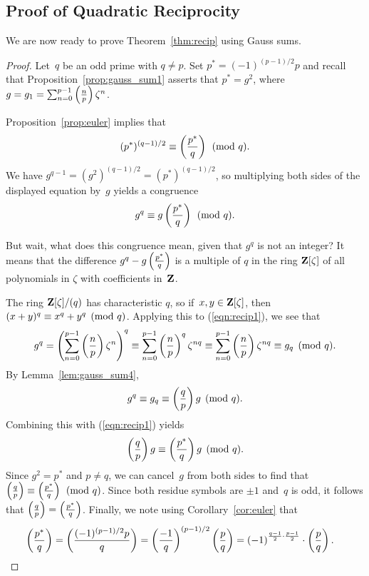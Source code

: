 \subsection{Proof of Quadratic Reciprocity}
We are now ready to prove Theorem~\ref{thm:recip} using
Gauss sums.
\begin{proof}
  Let~$q$ be an odd prime with $q\neq p$.  Set $p^* = (-1)^{(p-1)/2}p$
  and recall that Proposition~\ref{prop:gauss_sum1} asserts that $p^*
  = g^2$,
  where $g = g_1 = \sum_{n=0}^{p-1} \left(\frac{n}{p}\right)\zeta^n$.

  Proposition~\ref{prop:euler} implies that
  $$
  (p^*)^{(q-1)/2} \equiv \left(\frac{p^*}{q}\right) \pmod{q}.
  $$
  We have $g^{q-1} = (g^2)^{(q-1)/2} = (p^*)^{(q-1)/2}$, so
  multiplying both sides of the displayed equation by~$g$ yields a
  congruence
\begin{equation}\label{eqn:recip1}
  g^q \equiv g \left(\frac{p^*}{q}\right) \pmod{q}.
\end{equation}

But wait, what does this congruence mean, given that $g^q$ is not an
integer?  It means that the difference $g^q - g \left(\frac{p^*}{q}\right)$ is a
multiple of $q$ in the ring $\mathbf{Z}[\zeta]$ of all polynomials in $\zeta$
with coefficients in~$\mathbf{Z}$.


The ring $\mathbf{Z}[\zeta]/(q)$ has characteristic $q$, so
if~$x, y\in\mathbf{Z}[\zeta]$, then $(x+y)^q \equiv x^q + y^q \pmod{q}$.
Applying this to (\ref{eqn:recip1}), we see that
$$
g^q = \left(\sum_{n=0}^{p-1} \left(\frac{n}{p}\right)\zeta^n \right)^q \equiv \sum_{n=0}^{p-1} \left(\frac{n}{p}\right)^q \zeta^{nq} \equiv \sum_{n=0}^{p-1} \left(\frac{n}{p}\right) \zeta^{nq} \equiv g_q\pmod{q}.
$$
By Lemma~\ref{lem:gauss_sum4},
$$
g^q \equiv g_q \equiv \left(\frac{q}{p}\right) g\pmod{q}.
$$
Combining this with (\ref{eqn:recip1}) yields
$$
\left(\frac{q}{p}\right) g \equiv \left(\frac{p^*}{q}\right)g \pmod{q}.
$$
Since $g^2 = p^*$ and $p\neq q$, we can cancel~$g$ from both sides
to find that $\left(\frac{q}{p}\right) \equiv \left(\frac{p^*}{q}\right) \pmod{q}$.  Since both
residue symbols are $\pm 1$ and~$q$ is odd, it follows that $\left(\frac{q}{p}\right)
= \left(\frac{p^*}{q}\right)$.
Finally, we note using Corollary~\ref{cor:euler}
that
\begin{align*}
\left(\frac{p^*}{q}\right) &= \left(\frac{(-1)^{(p-1)/2}p}{q}\right)
        = \left(\frac{-1}{q}\right)^{(p-1)/2} \left(\frac{p}{q}\right)
        = \left(-1\right)^{\frac{q-1}{2}\cdot \frac{p-1}{2}} \cdot \left(\frac{p}{q}\right).
\end{align*}
\end{proof}

